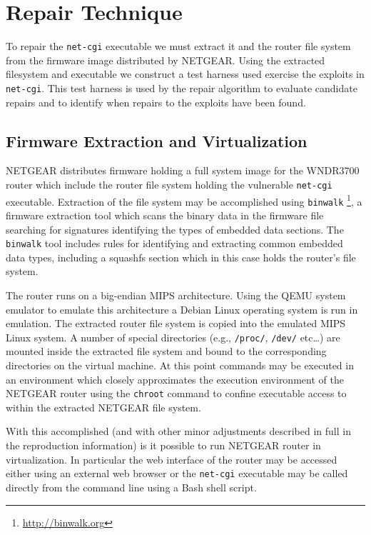 \documentclass{sigcomm-alternate}
\begin{document}
\section{Repair Technique}
\label{sec-3}
To repair the \texttt{net-cgi} executable we must extract it and the router
file system from the firmware image distributed by NETGEAR.  Using the
extracted filesystem and executable we construct a test harness used
exercise the exploits in \texttt{net-cgi}.  This test harness is used by the
repair algorithm to evaluate candidate repairs and to identify when
repairs to the exploits have been found.

\subsection{Firmware Extraction and Virtualization}
\label{sec-3-1}
NETGEAR distributes firmware holding a full system image for the
WNDR3700 router which include the router file system holding the
vulnerable \texttt{net-cgi} executable.  Extraction of the file system may be
accomplished using \texttt{binwalk} \footnote{\url{http://binwalk.org}}, a firmware extraction tool which
scans the binary data in the firmware file searching for signatures
identifying the types of embedded data sections.  The \texttt{binwalk} tool
includes rules for identifying and extracting common embedded data
types, including a squashfs \cite{lougher2006squashfs} section which in
this case holds the router's file system.

The router runs on a big-endian MIPS architecture.  Using the QEMU
\cite{bellard2005qemu} system emulator to emulate this architecture a
Debian Linux operating system is run in emulation.  The extracted
router file system is copied into the emulated MIPS Linux system.  A
number of special directories (e.g., \texttt{/proc/}, \texttt{/dev/} etc\ldots{}) are
mounted inside the extracted file system and bound to the
corresponding directories on the virtual machine.  At this point
commands may be executed in an environment which closely approximates
the execution environment of the NETGEAR router using the \texttt{chroot}
command to confine executable access to within the extracted NETGEAR
file system.

With this accomplished (and with other minor adjustments described in
full in the reproduction information) is it possible to run NETGEAR
router in virtualization.  In particular the web interface of the
router may be accessed either using an external web browser or the
\texttt{net-cgi} executable may be called directly from the command
line using a Bash shell script.
\end{document}
